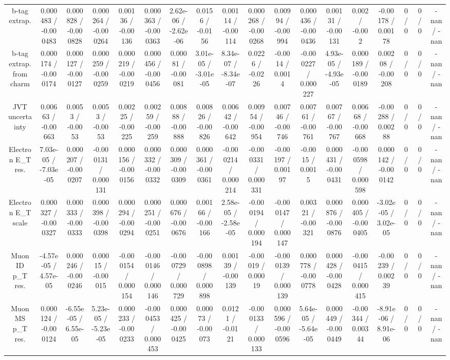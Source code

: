 \documentclass[10pt]{article}
\begin{document}
\begin{table}[htbp]
\begin{center}
\begin{tabular}{|c|c|c|c|c|c|c|c|c|c|c|c|c|c|c|c|c|c|}
  b-tag extrap. & 0.000483 / -0.000483 & 0.000828 / -0.000828 & 0.000264 / -0.000264 & 0.00136 / -0.00136 & 0.000363 / -0.000363 & 2.62e-06 / -2.62e-06 & 0.0156 / -0.0156 & 0.00114 / -0.00114 & 0.000268 / -0.000268 & 0.00994 / -0.00994 & 0.000436 / -0.000436 & 0.00131 / -0.00131 & 0.002 / -0.002 & -0.00178 / 0.00178 & 0 / 0 & 0 / 0 & -nan / -nan \\ 
  b-tag extrap. from charm & 0.000174 / -0.000174 & 0.000127 / -0.000127 & 0.000259 / -0.000259 & 0.000219 / -0.000219 & 0.000456 / -0.000456 & 0.00081 / -0.00081 & 3.01e-05 / -3.01e-05 & 8.34e-07 / -8.34e-07 & 0.0226 / -0.0226 & -0.0014 / 0.0014 & -0.000227 / 0.000227 & 4.93e-05 / -4.93e-05 & 0.000189 / -0.000189 & 0.00208 / -0.00208 & 0 / 0 & 0 / 0 & -nan / -nan \\ 
  JVT uncertainty & 0.00663 / -0.00663 & 0.0053 / -0.0053 & 0.0053 / -0.0053 & 0.00225 / -0.00225 & 0.00259 / -0.00259 & 0.00888 / -0.00888 & 0.00826 / -0.00826 & 0.00642 / -0.00642 & 0.00954 / -0.00954 & 0.00746 / -0.00746 & 0.00761 / -0.00761 & 0.00767 / -0.00767 & 0.00668 / -0.00668 & -0.00288 / 0.00288 & 0 / 0 & 0 / 0 & -nan / -nan \\ 
  Electron E_{T} res. & 7.03e-05 / -7.03e-05 & 0.000207 / -0.000207 & -0.000131 / 0.000131 & 0.000156 / -0.000156 & 0.000332 / -0.000332 & 0.000309 / -0.000309 & 0.000361 / -0.000361 & -0.000214 / 0.000214 & -0.000331 / 0.000331 & -0.00197 / 0.00197 & -0.0015 / 0.0015 & 0.000431 / -0.000431 & -0.000598 / 0.000598 & 0.000142 / -0.000142 & 0 / 0 & 0 / 0 & -nan / -nan \\ 
  Electron E_{T} scale & 0.000327 / -0.000327 & 0.000333 / -0.000333 & 0.000398 / -0.000398 & 0.000294 / -0.000294 & 0.000251 / -0.000251 & 0.000676 / -0.000676 & 0.00166 / -0.00166 & 2.58e-05 / -2.58e-05 & -0.000194 / 0.000194 & -0.000147 / 0.000147 & 0.00321 / -0.00321 & 0.000876 / -0.000876 & 0.000405 / -0.000405 & -3.02e-05 / 3.02e-05 & 0 / 0 & 0 / 0 & -nan / -nan \\ 
  Muon ID p_{T} res. & -4.57e-05 / 4.57e-05 & 0.000246 / -0.000246 & 0.00015 / -0.00015 & -0.000154 / 0.000154 & -0.000146 / 0.000146 & -0.000729 / 0.000729 & -0.000898 / 0.000898 & 0.00139 / -0.00139 & -0.00019 / 0.00019 & -0.000139 / 0.000139 & 0.000778 / -0.000778 & 0.000428 / -0.000428 & -0.000415 / 0.000415 & -0.00239 / 0.00239 & 0 / 0 & 0 / 0 & -nan / -nan \\ 
  Muon MS p_{T} res. & 0.000124 / -0.000124 & -6.55e-05 / 6.55e-05 & 5.23e-05 / -5.23e-05 & 0.000233 / -0.000233 & -0.000453 / 0.000453 & 0.000425 / -0.000425 & 0.00073 / -0.00073 & 0.0121 / -0.0121 & -0.000133 / 0.000133 & 0.000596 / -0.000596 & 5.64e-05 / -5.64e-05 & 0.000449 / -0.000449 & -0.00344 / 0.00344 & -8.91e-06 / 8.91e-06 & 0 / 0 & 0 / 0 & -nan / -nan \\ 

\end{tabular}
\end{center}
\end{table}
\end{document}
